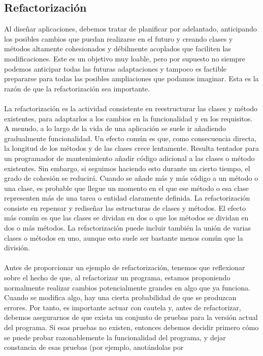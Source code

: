 \documentclass[11pt,a4paper]{article}
\begin{document}
\subsection{Refactorización}
Al diseñar aplicaciones, debemos tratar de planificar por adelantado, anticipando los posibles cambios
que puedan realizarse en el futuro y creando clases y métodos altamente cohesionados y
débilmente acoplados que faciliten las modificaciones. Este es un objetivo muy loable, pero por
supuesto no siempre podemos anticipar todas las futuras adaptaciones y tampoco es factible prepararse
para todas las posibles ampliaciones que podamos imaginar.
Esta es la razón de que la refactorización sea importante.\\
\\
La refactorización es la actividad consistente en reestructurar las clases y método existentes, para
adaptarlos a los cambios en la funcionalidad y en los requisitos. A menudo, a lo largo de la vida de
una aplicación se suele ir añadiendo gradualmente funcionalidad. Un efecto común es que, como
consecuencia directa, la longitud de los métodos y de las clases crece lentamente.
Resulta tentador para un programador de mantenimiento añadir código adicional a las clases o
método existentes. Sin embargo, si seguimos haciendo esto durante un cierto tiempo, el grado de
cohesión se reducirá. Cuando se añade más y más código a un método o una clase, es probable
que llegue un momento en el que ese método o esa clase representen más de una tarea o entidad
claramente definida.
La refactorización consiste en repensar y rediseñar las estructuras de clases y métodos. El efecto
más común es que las clases se dividan en dos o que los métodos se dividan en dos o más métodos.
La refactorización puede incluir también la unión de varias clases o métodos en uno, aunque esto
suele ser bastante menos común que la división.\\
\\
Antes de proporcionar un ejemplo de refactorización, tenemos que reflexionar sobre el hecho de
que, al refactorizar un programa, estamos proponiendo normalmente realizar cambios potencialmente
grandes en algo que ya funciona. Cuando se modifica algo, hay una cierta probabilidad de
que se produzcan errores. Por tanto, es importante actuar con cautela y, antes de refactorizar, debemos
asegurarnos de que exista un conjunto de pruebas para la versión actual del programa. Si esas
pruebas no existen, entonces debemos decidir primero cómo se puede probar razonablemente la
funcionalidad del programa, y dejar constancia de esas pruebas (por ejemplo, anotándolas por
\end{document}
